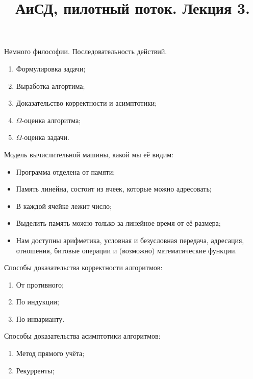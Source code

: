 \documentclass[a4paper, 12pt]{article}
\title{АиСД, пилотный поток. Лекция 3.}
\author{}
\date{}
\begin{document}
    \maketitle

    Немного философии. Последовательность действий.
    \begin{enumerate}
        \item Формулировка задачи;
        \item Выработка алгортима;
        \item Доказательство корректности и асимптотики;
        \item \(\Omega\)-оценка алгоритма;
        \item \(\Omega\)-оценка задачи.
    \end{enumerate}

    Модель вычислительной машины, какой мы её видим:
    \begin{itemize}
        \item Программа отделена от памяти;
        \item Память линейна, состоит из ячеек, которые можно адресовать;
        \item В каждой ячейке лежит число;
        \item Выделить память можно только за линейное время от её размера;
        \item Нам доступны арифметика, условная и безусловная передача, адресация, отношения, битовые операции и (возможно) математические функции.
    \end{itemize}

    Способы доказательства корректности алгоритмов:
    \begin{enumerate}
        \item От противного;
        \item По индукции;
        \item По инварианту.
    \end{enumerate}

    Способы доказательства асимптотики алгоритмов:
    \begin{enumerate}
        \item Метод прямого учёта;
        \item Рекурренты;

    \end{enumerate}
\end{document}
